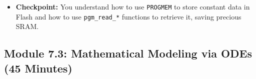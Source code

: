 \documentclass[11pt,a4paper]{article}
\begin{document}
\begin{itemize}
\begin{enumerate}
\begin{lstlisting}[caption={Code for Module 7.2: Using PROGMEM}]
    char lcd_buffer[16];
    char float_buffer[8];
    
    // dtostrf is a non-standard but common AVR function to convert float to string
    // dtostrf(float_val, min_width, num_digits_after_decimal, output_buffer);
    dtostrf(feet_to_meters, 4, 4, float_buffer);
    
    // snprintf is a safe way to format strings
    snprintf(lcd_buffer, 16, ``1ft = %s m'', float_buffer);
    
    lcd_print(lcd_buffer);

    while(1) {}
    return 0;
}
\end{lstlisting}
    \end{enumerate}
    \item \textbf{Checkpoint:} You understand how to use \verb|PROGMEM| to store constant data in Flash and how to use \verb|pgm_read_*| functions to retrieve it, saving precious SRAM.
\end{itemize}
\newpage
\subsection*{Module 7.3: Mathematical Modeling via ODEs (45 Minutes)}
\end{document}
